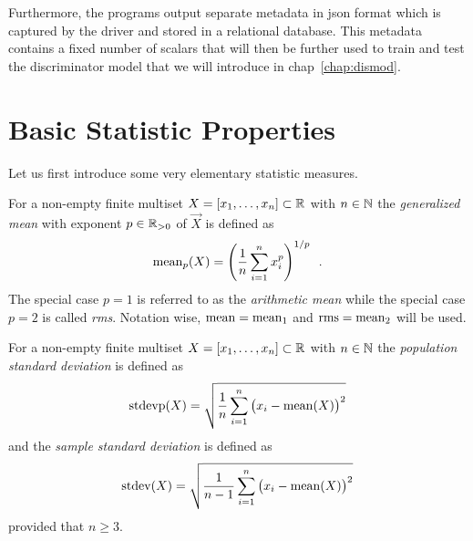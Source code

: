 \documentclass{graphstudy}
\begin{document}
Furthermore, the programs output separate metadata in \ac{json} format which is captured by the driver and stored in a
relational database.  This metadata contains a fixed number of scalars that will then be further used to train and test
the discriminator model that we will introduce in \acl{chap}~\ref{chap:dismod}.

\section{Basic Statistic Properties}

Let us first introduce some very elementary statistic measures.

\begin{definition}
  For a non-empty finite multiset \(\Vec{X}=\multiset{x_1,\ldots,x_n}\subset\Reals\) with \(n\in\mathbb{N}\) the
  \emph{generalized mean} with exponent \(p\in\RealsPos\) of \(\Vec{X}\) is defined as
  \begin{equation}
    \operatorname{mean}_p(\relax{X}) = \left( \frac{1}{n} \sum_{i=1}^{n} x_i^p \right)^{1/p}
    \enspace.
  \end{equation}
  The special case \(p=1\) is referred to as the \emph{arithmetic mean} while the special case \(p=2\) is called
  \emph{\acf{rms}}.  Notation wise, \(\operatorname{mean}=\operatorname{mean}_1\) and \(\operatorname{rms}=\operatorname{mean}_2\) will be used.
\end{definition}

\begin{definition}
  For a non-empty finite multiset \(\Vec{X}=\multiset{x_1,\ldots,x_n}\subset\Reals\) with \(n\in\mathbb{N}\) the
  \emph{population standard deviation} is defined as
  \begin{equation}
    \label{eq:stdevp}
    \operatorname{stdevp}(\relax{X}) = \sqrt{\frac{1}{n} \sum_{i=1}^{n} \big(x_i - \operatorname{mean}(\relax{X})\big)^2}
  \end{equation}
  and the \emph{sample standard deviation} is defined as
  \begin{equation}
    \label{eq:stdevp}
    \operatorname{stdev}(\relax{X}) = \sqrt{\frac{1}{n-1} \sum_{i=1}^{n} \big(x_i - \operatorname{mean}(\relax{X})\big)^2}
  \end{equation}
  provided that \(n\geq3\).
\end{definition}
\end{document}
